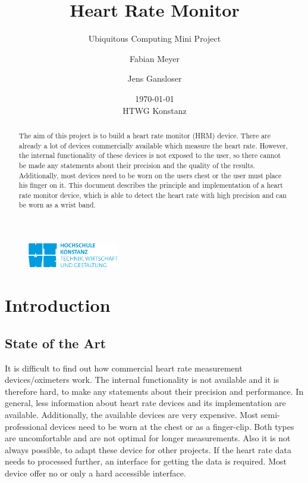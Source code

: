 \documentclass[notitlepage]{scrreprt}
\begin{document}
\title{Heart Rate Monitor}
\subtitle{Ubiquitous Computing Mini Project}
\author{Fabian Meyer \and Jens Gansloser}
\date{\today \\ HTWG Konstanz}
\maketitle
\thispagestyle{empty}

\begin{figure}[H]
	\centering
	\includegraphics[width=150px]{images/htwgLogo.jpg}
\end{figure}

\begin{abstract}
The aim of this project is to build a heart rate monitor (HRM) device. There are already a lot of devices commercially available which measure the heart rate. However, the internal functionality of these devices is not exposed to the user, so there cannot be made any statements about their precision and the quality of the results. Additionally, most devices need to be worn on the users chest or the user must place his finger on it. This document describes the principle and implementation of a heart rate monitor device, which is able to detect the heart rate with high precision and can be worn as a wrist band.
\end{abstract}
\clearpage

\tableofcontents

\chapter{Introduction}
\section{State of the Art}
It is difficult to find out how commercial heart rate measurement devices/oximeters work. The internal functionality is not available and it is therefore hard, to make any statements about their precision and performance. In general, less information about heart rate devices and its implementation are available. Additionally, the available devices are very expensive. Most semi-professional devices need to be worn at the chest or as a finger-clip. Both types are uncomfortable and are not optimal for longer measurements. Also it is not always possible, to adapt these device for other projects. If the heart rate data needs to processed further, an interface for getting the data is required. Most device offer no or only a hard accessible interface.
\end{document}
